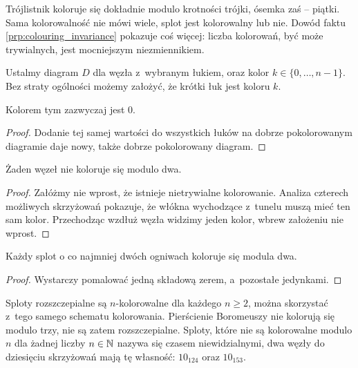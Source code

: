 Trójlistnik koloruje się dokładnie modulo krotności trójki, ósemka zaś -- piątki.
Sama kolorowalność nie mówi wiele, splot jest kolorowalny lub nie.
Dowód faktu \ref{prp:colouring_invariance} pokazuje coś więcej: liczba kolorowań, być może trywialnych, jest mocniejszym niezmiennikiem.

\begin{lemma}
    \label{lem:colouring_arc}
    Ustalmy diagram $D$ dla węzła z~wybranym łukiem, oraz kolor $k \in \{0, \ldots, n - 1\}$.
    Bez straty ogólności możemy założyć, że krótki łuk jest koloru $k$.
\end{lemma}

Kolorem tym zazwyczaj jest $0$.

\begin{proof}
    Dodanie tej samej wartości do wszystkich łuków na dobrze pokolorowanym diagramie daje nowy, także dobrze pokolorowany diagram.
\end{proof}

\begin{proposition}
    \label{prp:no_colourings_mod_2}
    Żaden węzeł nie koloruje się modulo dwa.
\end{proposition}

\begin{proof}
    Załóżmy nie wprost, że istnieje nietrywialne kolorowanie.
    Analiza czterech możliwych skrzyżowań pokazuje, że włókna wychodzące z~tunelu muszą mieć ten sam kolor.
    Przechodząc wzdłuż węzła widzimy jeden kolor, wbrew założeniu nie wprost.
\end{proof}

\begin{proposition}
    Każdy splot o co najmniej dwóch ogniwach koloruje się modula dwa.
\end{proposition}

\begin{proof}
    Wystarczy pomalować jedną składową zerem, a~pozostałe jedynkami.
\end{proof}

Sploty rozszczepialne są $n$-kolorowalne dla każdego $n \ge 2$, można skorzystać z~tego samego schematu kolorowania.
%
Pierścienie Boromeuszy nie kolorują się modulo trzy, nie są zatem rozszczepialne.
%
Sploty, które nie są kolorowalne modulo $n$ dla żadnej liczby $n \in \mathbb N$ nazywa się czasem niewidzialnymi, dwa węzły do dziesięciu skrzyżowań mają tę własność: $10_{124}$ oraz $10_{153}$.
%

